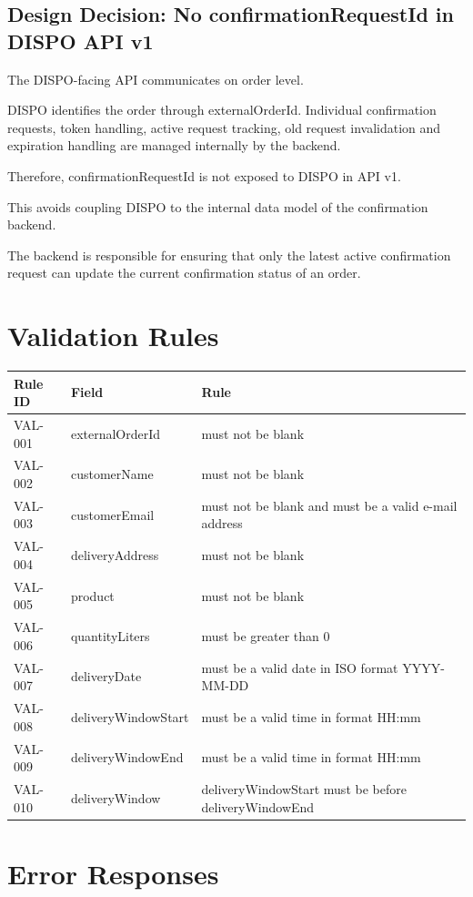 \documentclass[a4paper,11pt]{article}
\begin{document}
\subsection{Design Decision: No confirmationRequestId in DISPO API v1}

The DISPO-facing API communicates on order level.

DISPO identifies the order through externalOrderId. Individual confirmation requests, token handling, active request tracking, old request invalidation and expiration handling are managed internally by the backend.

Therefore, confirmationRequestId is not exposed to DISPO in API v1.

This avoids coupling DISPO to the internal data model of the confirmation backend.

The backend is responsible for ensuring that only the latest active confirmation request can update the current confirmation status of an order.
	
\section{Validation Rules}

\begin{longtable}{p{2cm}p{4cm}p{8cm}}
	\toprule
	Rule ID & Field & Rule \\
	\midrule
	VAL-001 & externalOrderId & must not be blank \\
	VAL-002 & customerName & must not be blank \\
	VAL-003 & customerEmail & must not be blank and must be a valid e-mail address \\
	VAL-004 & deliveryAddress & must not be blank \\
	VAL-005 & product & must not be blank \\
	VAL-006 & quantityLiters & must be greater than 0 \\
	VAL-007 & deliveryDate & must be a valid date in ISO format YYYY-MM-DD \\
	VAL-008 & deliveryWindowStart & must be a valid time in format HH:mm \\
	VAL-009 & deliveryWindowEnd & must be a valid time in format HH:mm \\
	VAL-010 & deliveryWindow & deliveryWindowStart must be before deliveryWindowEnd \\
	\bottomrule
\end{longtable}
	
\section{Error Responses}
\end{document}
